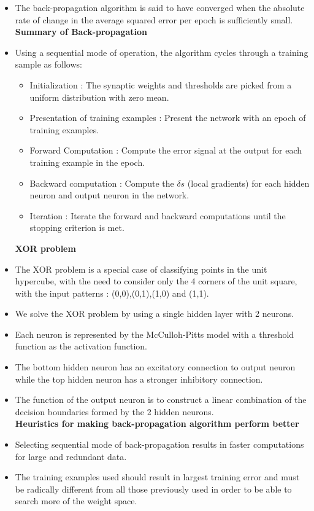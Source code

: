 \documentclass[12pt]{article}
\begin{document}
\begin{itemize}
\item The back-propagation algorithm is said to have converged when the absolute rate of change in the average squared error per epoch is sufficiently small.\\
[2mm]
\textbf{Summary of Back-propagation}
\item Using a sequential mode of operation, the algorithm cycles through a training sample as follows:
\begin{itemize}
\item Initialization : The synaptic weights and thresholds are picked from a uniform distribution with zero mean.
\item Presentation of training examples : Present the network with an epoch of training examples.
\item Forward Computation : Compute the error signal at the output for each training example in the epoch.
\item Backward computation : Compute the $\delta s$ (local gradients) for each hidden neuron and output neuron in the network.
\item Iteration : Iterate the forward and backward computations until the stopping criterion is met.
\end{itemize}
\textbf{XOR problem}
\item The XOR problem is a special case of classifying points in the unit hypercube, with the need to consider only the 4 corners of the unit square, with the input patterns : (0,0),(0,1),(1,0) and (1,1).
\item We solve the XOR problem by using a single hidden layer with 2 neurons.
\item Each neuron is represented by the McCulloh-Pitts model with a threshold function as the activation function.
\item The bottom hidden neuron has an excitatory connection to output neuron while the top hidden neuron has a stronger inhibitory connection.
\item The function of the output neuron is to construct a linear combination of the decision boundaries formed by the 2 hidden neurons.\\
[2mm]
\textbf{Heuristics for making back-propagation algorithm perform better}
\item Selecting sequential mode of back-propagation results in faster computations for large and redundant data.
\item The training examples used should result in largest training error and must be radically different from all those previously used in order to be able to search more of the weight space.

\end{itemize}
\end{document}
